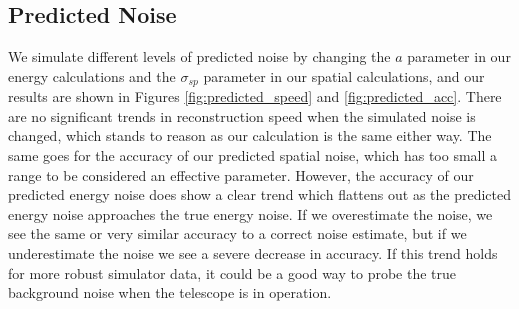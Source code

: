\subsection*{Predicted Noise}
We simulate different levels of predicted noise by changing the $a$ parameter in our energy calculations and the $\sigma_{sp}$ parameter in our spatial calculations, and our results are shown in Figures \ref{fig:predicted_speed} and \ref{fig:predicted_acc}. There are no significant trends in reconstruction speed when the simulated noise is changed, which stands to reason as our calculation is the same either way. The same goes for the accuracy of our predicted spatial noise, which has too small a range to be considered an effective parameter. However, the accuracy of our predicted energy noise does show a clear trend which flattens out as the predicted energy noise approaches the true energy noise. If we overestimate the noise, we see the same or very similar accuracy to a correct noise estimate, but if we underestimate the noise we see a severe decrease in accuracy. If this trend holds for more robust simulator data, it could be a good way to probe the true background noise when the telescope is in operation.

